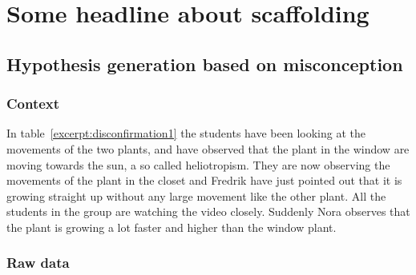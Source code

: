 \section{Some headline about scaffolding}

\subsection{Hypothesis generation based on misconception}


\subsubsection*{Context}
In table~\ref{excerpt:disconfirmation1} the students have been looking at the movements of the two plants, and have observed that the plant in the window are moving towards the sun, a so called heliotropism. They are now observing the movements of the plant in the closet and Fredrik have just pointed out that it is growing straight up without any large movement like the other plant. All the students in the group are watching the video closely. Suddenly Nora observes that the plant is growing a lot faster and higher than the window plant.


\subsubsection*{Raw data}

